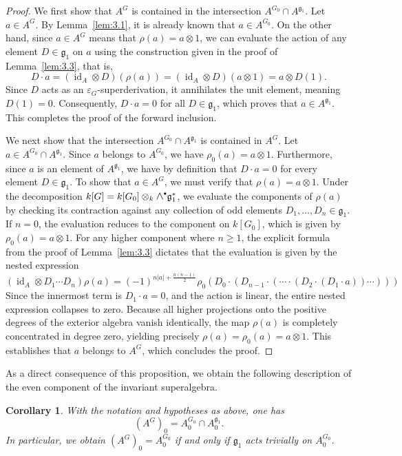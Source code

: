 \documentclass[11pt,a4paper,reqno,noamsfonts]{amsart}
\numberwithin{equation}{section}
\newtheorem{corollary}[theorem]{Corollary}
\theoremstyle{definition}
\theoremstyle{remark}
\newcommand{\gfrak}{\ensuremath{\mathfrak{g}}}
\DeclareMathOperator{\id}{id}
\newcommand{\medwedge}{\mathbin{\scalebox{1.2}{$\wedge$}}}
\newcommand*{\sbullet}{\raisebox{0.1ex}{\scalebox{0.6}{$\bullet$}}}
\begin{document}
\begin{proof}
We first show that $A^{G}$ is contained in the intersection $A^{G_{0}} \cap A^{\gfrak_{1}}$. Let $a \in A^G$. By Lemma~\ref{lem:3.1}, it is already known that $a \in A^{G_0}$. On the other hand, since $a \in A^G$ means that $\rho(a) = a \otimes 1$, we can evaluate the action of any element $D \in \gfrak_1$ on $a$ using the construction given in the proof of Lemma~\ref{lem:3.3}, that is,
$$
D\cdot a=(\id_{A}\otimes D)(\rho(a)) =(\id_{A}\otimes D)(a\otimes 1)=a\otimes D (1).
$$
Since $D$ acts as an $\varepsilon _{G}$-superderivation, it annihilates the unit element, meaning $D(1) = 0$. Consequently, $D \cdot a = 0$ for all $D \in \gfrak_1$, which proves that $a \in A^{\gfrak_1}$. This completes the proof of the forward inclusion.

We next show that the intersection $A^{G_0} \cap A^{\gfrak_1}$ is contained in $A^{G}$. Let $a \in A^{G_0} \cap A^{\gfrak_1}$. Since $a$ belongs to $A^{G_{0}}$, we have $\rho_0(a) = a \otimes 1$. Furthermore, since $a$ is an element of $A^{\mathfrak{g}_{1}}$, we have by definition that $D \cdot a = 0$ for every element $D \in \gfrak_1$. To show that $a \in A^G$, we must verify that $\rho(a) = a \otimes 1$. Under the decomposition $k[G] = k[G_0] \otimes_k \medwedge^{\sbullet} \gfrak_1^*$, we evaluate the components of $\rho(a)$ by checking its contraction against any collection of odd elements $D_1, \dots, D_n \in \gfrak_1$. If $n = 0$, the evaluation reduces to the component on $k[G_0]$, which is given by $\rho_0(a) = a \otimes 1$. For any higher component where $n \geq 1$, the explicit formula from the proof of Lemma~\ref{lem:3.3} dictates that the evaluation is given by the nested expression
$$
(\id_A \otimes D_1 \cdots D_n)\rho(a) = (-1)^{n\lvert a \rvert + \frac{n(n-1)}{2}} \rho_0 ( D_0 \cdot ( D_{n-1} \cdot ( \cdots \cdot ( D_2 \cdot (D_1 \cdot a)) \cdots )))
$$
Since the innermost term is $D_1 \cdot a = 0$, and the action is linear, the entire nested expression collapses to zero. Because all higher projections onto the positive degrees of the exterior algebra vanish identically, the map $\rho(a)$ is completely concentrated in degree zero, yielding precisely $\rho(a) = \rho_0(a) = a \otimes 1$. This establishes that $a$ belongs to $A^{G}$, which concludes the proof.
\end{proof}

As a direct consequence of this proposition, we obtain the following description of the even component of the invariant superalgebra.

\begin{corollary}\label{cor:3.5}
With the notation and hypotheses as above, one has
\begin{equation}
(A^G)_0 = A_0^{G_0} \cap A_0^{\gfrak_1}.
\end{equation}
In particular, we obtain $(A^G)_0 = A_0^{G_0}$ if and only if $\gfrak_{1}$ acts trivially on $A_0^{G_0}$. 
\end{corollary}
\end{document}
